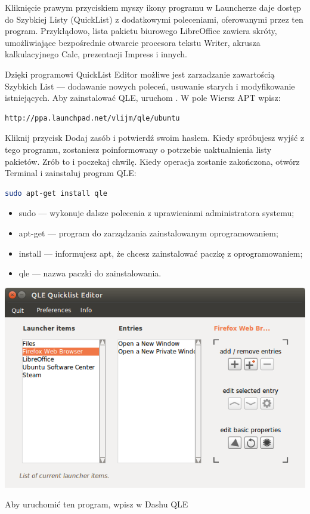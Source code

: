 Kliknięcie prawym przyciskiem myszy ikony programu w Launcherze daje dostęp do Szybkiej Listy (QuickList) z dodatkowymi poleceniami, oferowanymi przez ten program. Przykłądowo, lista pakietu biurowego LibreOffice zawiera skróty, umożliwiające bezpośrednie otwarcie procesora tekstu Writer, akrusza kalkulacyjnego Calc, prezentacji Impress i innych.

Dzięki programowi QuickList Editor możliwe jest zarzadzanie zawartością Szybkich List --- dodawanie nowych poleceń, usuwanie starych i modyfikowanie istniejących. Aby zainstalować QLE, uruchom . W pole \textcolor{ubuntu_orange}{Wiersz APT} wpisz:
\begin{lstlisting}
http://ppa.launchpad.net/vlijm/qle/ubuntu
\end{lstlisting}
Kliknij przycisk \textcolor{ubuntu_orange}{Dodaj zasób} i potwierdź swoim hasłem. Kiedy spróbujesz wyjść z tego programu, zostaniesz poinformowany o potrzebie uaktualnienia listy pakietów. Zrób to i poczekaj chwilę. Kiedy operacja zostanie zakończona, otwórz Terminal i zainstaluj program QLE:
\begin{lstlisting}[language=bash]
sudo apt-get install qle
\end{lstlisting}
\begin{itemize}
\item \textcolor{ubuntu_orange}{sudo} --- wykonuje dalsze polecenia z uprawieniami administratora systemu;
\item \textcolor{ubuntu_orange}{apt-get} --- program do zarządzania zainstalowanym oprogramowaniem;
\item \textcolor{ubuntu_orange}{install} --- informujesz apt, że chcesz zainstalować paczkę z oprogramowaniem;
\item \textcolor{ubuntu_orange}{qle} --- nazwa paczki do zainstalowania.
\end{itemize}
\begin{center}
	\includegraphics[width=\linewidth]{images/programy_qle.png}
\end{center}

Aby uruchomić ten program, wpisz w Dashu \textcolor{ubuntu_orange}{QLE}
